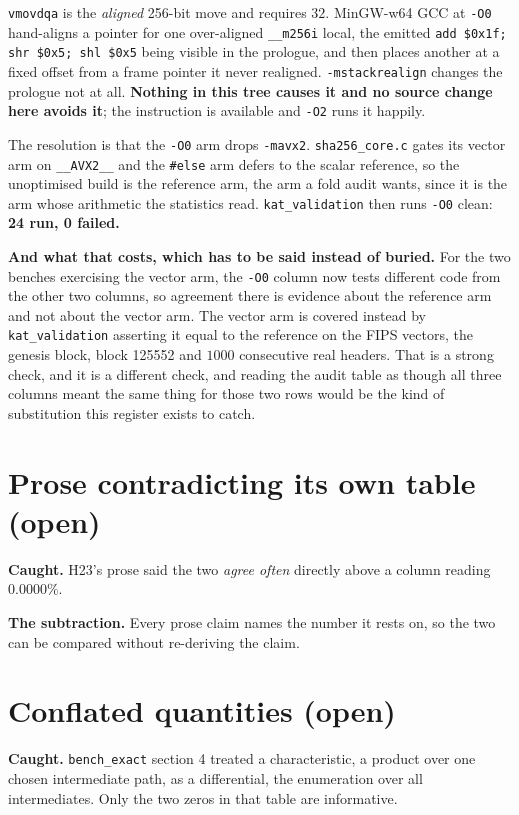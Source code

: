 \texttt{vmovdqa} is the \emph{aligned} 256-bit move and requires \(32\). MinGW-w64 GCC at \texttt{-O0} hand-aligns a pointer for one over-aligned \texttt{\_\_m256i} local, the emitted \texttt{add \$0x1f; shr \$0x5; shl \$0x5} being visible in the prologue, and then places another at a fixed offset from a frame pointer it never realigned. \texttt{-mstackrealign} changes the prologue not at all. \textbf{Nothing in this tree causes it and no source change here avoids it}; the instruction is available and \texttt{-O2} runs it happily.

The resolution is that the \texttt{-O0} arm drops \texttt{-mavx2}. \texttt{sha256\_core.c} gates its vector arm on \texttt{\_\_AVX2\_\_} and the \texttt{\#else} arm defers to the scalar reference, so the unoptimised build is the reference arm, the arm a fold audit wants, since it is the arm whose arithmetic the statistics read. \texttt{kat\_validation} then runs \texttt{-O0} clean: \textbf{24 run, 0 failed.}

\textbf{And what that costs, which has to be said instead of buried.} For the two benches exercising the vector arm, the \texttt{-O0} column now tests different code from the other two columns, so agreement there is evidence about the reference arm and not about the vector arm. The vector arm is covered instead by \texttt{kat\_validation} asserting it equal to the reference on the FIPS vectors, the genesis block, block 125552 and \(1000\) consecutive real headers. That is a strong check, and it is a different check, and reading the audit table as though all three columns meant the same thing for those two rows would be the kind of substitution this register exists to catch.

\section{Prose contradicting its own table (open)}

\textbf{Caught.} H23's prose said the two \emph{agree often} directly above a column reading \(0.0000\%\).

\textbf{The subtraction.} Every prose claim names the number it rests on, so the two can be compared without re-deriving the claim.

\section{Conflated quantities (open)}

\textbf{Caught.} \texttt{bench\_exact} section 4 treated a characteristic, a product over one chosen intermediate path, as a differential, the enumeration over all intermediates. Only the two zeros in that table are informative.

